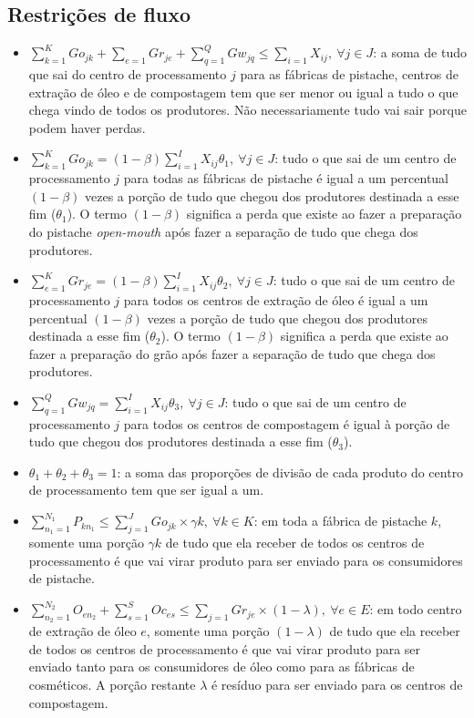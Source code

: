 \documentclass[]{article}
\begin{document}
		\subsection{Restrições de fluxo}
		
			\begin{itemize}
				\item $\sum\limits_{k=1}^K Go_{jk} + \sum\limits_{e=1} Gr_{je} + \sum\limits_{q=1}^Q Gw_{jq} \le \sum\limits_{i=1} X_{ij},~\forall j \in J$: a soma de tudo que sai do centro de processamento $j$ para as fábricas de pistache, centros de extração de óleo e de compostagem tem que ser menor ou igual a tudo o que chega vindo de todos os produtores. Não necessariamente tudo vai sair porque podem haver perdas.
				\item $\sum\limits_{k=1}^K Go_{jk} = (1-\beta) \sum\limits_{i=1}^I X_{ij}\theta_1,~\forall j\in J$: tudo o que sai de um centro de processamento $j$ para todas as fábricas de pistache é igual a um percentual $(1-\beta)$ vezes a porção de tudo que chegou dos produtores destinada a esse fim ($\theta_1$). O termo $(1-\beta)$ significa a perda que existe ao fazer a preparação do pistache \textit{open-mouth} após fazer a separação de tudo que chega dos produtores.
				\item $\sum\limits_{e=1}^K Gr_{je} = (1-\beta) \sum\limits_{i=1}^I X_{ij}\theta_2,~\forall j\in J$: tudo o que sai de um centro de processamento $j$ para todos os centros de extração de óleo é igual a um percentual $(1-\beta)$ vezes a porção de tudo que chegou dos produtores destinada a esse fim ($\theta_2$). O termo $(1-\beta)$ significa a perda que existe ao fazer a preparação do grão após fazer a separação de tudo que chega dos produtores.
				\item $\sum\limits_{q=1}^Q Gw_{jq} = \sum\limits_{i=1}^I X_{ij}\theta_3,~\forall j\in J$: tudo o que sai de um centro de processamento $j$ para todos os centros de compostagem é igual à porção de tudo que chegou dos produtores destinada a esse fim ($\theta_3$).
				\item $\theta_1 + \theta_2 + \theta_3 = 1$: a soma das proporções de divisão de cada produto do centro de processamento tem que ser igual a um.
				\item $\sum\limits_{n_1=1}^{N_1} P_{kn_1} \le \sum\limits_{j=1}^J Go_{jk} \times \gamma k,~\forall k \in K$: em toda a fábrica de pistache $k$, somente uma porção $\gamma k$ de tudo que ela receber de todos os centros de processamento é que vai virar produto para ser enviado para os consumidores de pistache.
				\item $\sum\limits_{n_2=1}^{N_2} O_{en_2} + \sum\limits_{s=1}^S Oc_{es} \le \sum\limits_{j=1} Gr_{je}\times(1-\lambda),~\forall e\in E$: em todo centro de extração de óleo $e$, somente uma porção $(1-\lambda)$ de tudo que ela receber de todos os centros de processamento é que vai virar produto para ser enviado tanto para os consumidores de óleo como para as fábricas de cosméticos. A porção restante $\lambda$ é resíduo para ser enviado para os centros de compostagem.

\end{itemize}
\end{document}
